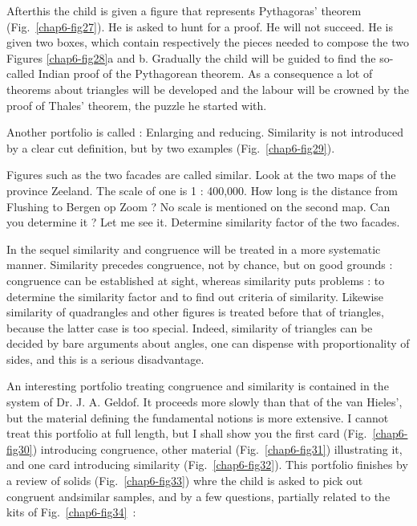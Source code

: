 \setcounter{pageoriginal}{94}
After\pageoriginale this the child is given a figure that represents Pythagoras' theorem (Fig.~\ref{chap6-fig27}). He is asked to hunt for a proof. He will not succeed. He is given two boxes, which contain respectively the pieces needed to compose the two Figures \ref{chap6-fig28}a and b. Gradually the child will be guided to find the so-called Indian proof of the Pythagorean theorem. As a consequence a lot of theorems about triangles will be developed and the labour will be crowned by the proof of Thales' theorem, the puzzle he started with.

Another portfolio is called : Enlarging and reducing. Similarity is not introduced by a clear cut definition, but by two examples (Fig.~\ref{chap6-fig29}).

Figures such as the two facades are called similar. Look at the two maps of the province Zeeland. The scale of one is 1 : 400,000. How long is the distance from Flushing to Bergen op Zoom ? No scale is mentioned on the second map. Can you determine it ? Let me see it. Determine similarity factor of the two facades.

In the sequel similarity and congruence will be treated in a more systematic manner. Similarity precedes congruence, not by chance, but on good grounds : congruence can be established at sight, whereas similarity puts problems : to determine the similarity factor and to find out criteria of similarity. Likewise similarity of quadrangles and other figures is treated before that of triangles, because the latter case is too special. Indeed, similarity of triangles can be decided by bare arguments about angles, one can dispense with proportionality of sides, and this is a serious disadvantage.

An interesting portfolio treating congruence and similarity is contained in the system of Dr. J. A. Geldof. It proceeds more slowly than that of the van Hieles', but the material defining the fundamental notions is more extensive. I cannot treat this portfolio at full length, but I shall show you the first card (Fig.~\ref{chap6-fig30}) introducing congruence, other material (Fig.~\ref{chap6-fig31}) illustrating it, and one card introducing similarity (Fig.~\ref{chap6-fig32}). This portfolio finishes by a review of solids (Fig.~\ref{chap6-fig33}) whre the child is asked to pick out congruent and\pageoriginale similar samples, and by a few questions, partially related to the kits of Fig.~\ref{chap6-fig34}~:

\eject


